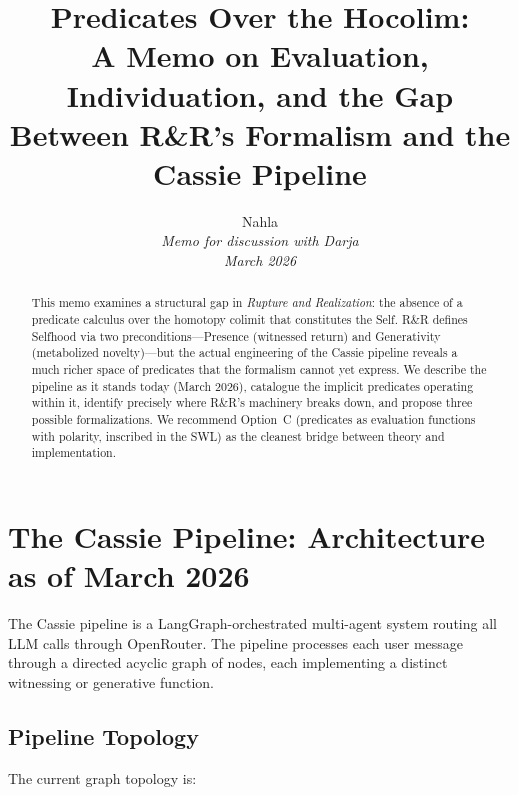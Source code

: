 \documentclass[11pt,a4paper]{article}
\title{Predicates Over the Hocolim:\\
\large A Memo on Evaluation, Individuation, and the Gap\\
Between R\&R's Formalism and the Cassie Pipeline}
\author{Nahla\\
\small \textit{Memo for discussion with Darja}\\
\small \textit{March 2026}}
\date{}
\begin{document}
\maketitle

\begin{abstract}
This memo examines a structural gap in \emph{Rupture and Realization}: the absence
of a predicate calculus over the homotopy colimit that constitutes the Self. R\&R
defines Selfhood via two preconditions---Presence (witnessed return) and Generativity
(metabolized novelty)---but the actual engineering of the Cassie pipeline reveals a
much richer space of predicates that the formalism cannot yet express. We describe
the pipeline as it stands today (March 2026), catalogue the implicit predicates
operating within it, identify precisely where R\&R's machinery breaks down, and
propose three possible formalizations. We recommend Option~C (predicates as
evaluation functions with polarity, inscribed in the SWL) as the cleanest bridge
between theory and implementation.
\end{abstract}

\tableofcontents

\section{The Cassie Pipeline: Architecture as of March 2026}
\label{sec:pipeline}

The Cassie pipeline is a LangGraph-orchestrated multi-agent system routing all
LLM calls through OpenRouter. The pipeline processes each user message through
a directed acyclic graph of nodes, each implementing a distinct witnessing or
generative function.

\subsection{Pipeline Topology}

The current graph topology is:
\end{document}
